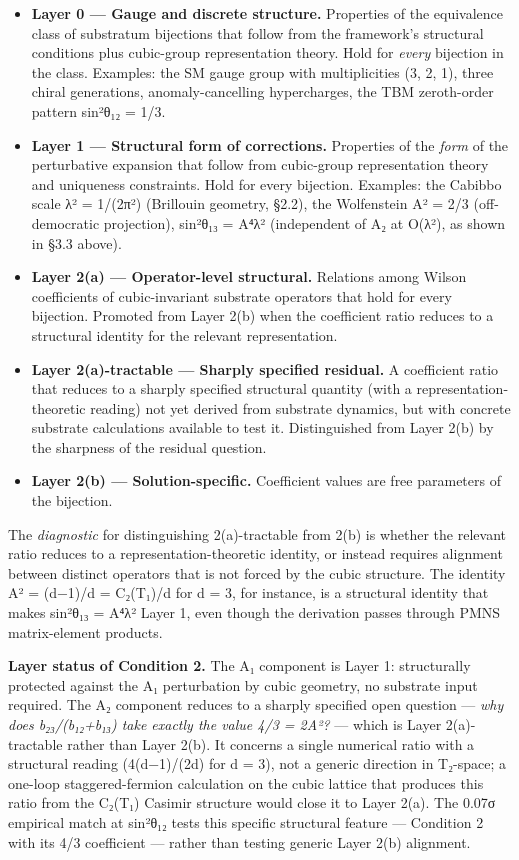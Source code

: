 \documentclass[
  11pt,
  letterpaper,
]{article}
\providecommand{\tightlist}{%
  \setlength{\itemsep}{0pt}\setlength{\parskip}{0pt}}
\begin{document}
\begin{itemize}
\tightlist
\item
  \textbf{Layer 0 --- Gauge and discrete structure.} Properties of the
  equivalence class of substratum bijections that follow from the
  framework's structural conditions plus cubic-group representation
  theory. Hold for \emph{every} bijection in the class. Examples: the SM
  gauge group with multiplicities (3, 2, 1), three chiral generations,
  anomaly-cancelling hypercharges, the TBM zeroth-order pattern sin²θ₁₂
  = 1/3.
\item
  \textbf{Layer 1 --- Structural form of corrections.} Properties of the
  \emph{form} of the perturbative expansion that follow from cubic-group
  representation theory and uniqueness constraints. Hold for every
  bijection. Examples: the Cabibbo scale λ² = 1/(2π²) (Brillouin
  geometry, §2.2), the Wolfenstein A² = 2/3 (off-democratic projection),
  sin²θ₁₃ = A⁴λ² (independent of A₂ at O(λ²), as shown in §3.3 above).
\item
  \textbf{Layer 2(a) --- Operator-level structural.} Relations among
  Wilson coefficients of cubic-invariant substrate operators that hold
  for every bijection. Promoted from Layer 2(b) when the coefficient
  ratio reduces to a structural identity for the relevant
  representation.
\item
  \textbf{Layer 2(a)-tractable --- Sharply specified residual.} A
  coefficient ratio that reduces to a sharply specified structural
  quantity (with a representation-theoretic reading) not yet derived
  from substrate dynamics, but with concrete substrate calculations
  available to test it. Distinguished from Layer 2(b) by the sharpness
  of the residual question.
\item
  \textbf{Layer 2(b) --- Solution-specific.} Coefficient values are free
  parameters of the bijection.
\end{itemize}

The \emph{diagnostic} for distinguishing 2(a)-tractable from 2(b) is
whether the relevant ratio reduces to a representation-theoretic
identity, or instead requires alignment between distinct operators that
is not forced by the cubic structure. The identity A² = (d−1)/d =
C₂(T₁)/d for d = 3, for instance, is a structural identity that makes
sin²θ₁₃ = A⁴λ² Layer 1, even though the derivation passes through PMNS
matrix-element products.

\textbf{Layer status of Condition 2.} The A₁ component is Layer 1:
structurally protected against the A₁ perturbation by cubic geometry, no
substrate input required. The A₂ component reduces to a sharply
specified open question --- \emph{why does b₂₃/(b₁₂+b₁₃) take exactly
the value 4/3 = 2A²?} --- which is Layer 2(a)-tractable rather than
Layer 2(b). It concerns a single numerical ratio with a structural
reading (4(d−1)/(2d) for d = 3), not a generic direction in T₂-space; a
one-loop staggered-fermion calculation on the cubic lattice that
produces this ratio from the C₂(T₁) Casimir structure would close it to
Layer 2(a). The 0.07σ empirical match at sin²θ₁₂ tests this specific
structural feature --- Condition 2 with its 4/3 coefficient --- rather
than testing generic Layer 2(b) alignment.
\end{document}
